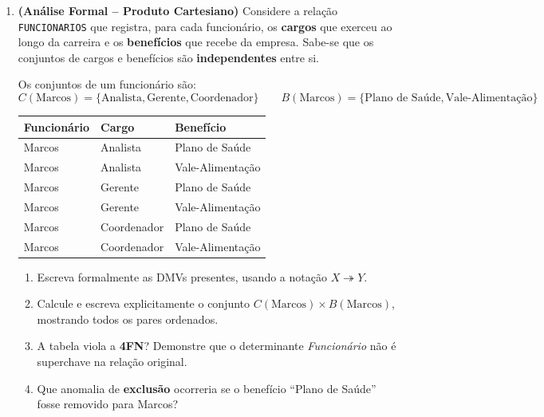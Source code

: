 \documentclass[12pt]{article}
\begin{document}
\begin{enumerate}[label=\textbf{Questão \arabic*:}, leftmargin=*]
  \vspace{0.4cm}

  \item \textbf{(Análise Formal -- Produto Cartesiano)} Considere a relação \texttt{FUNCIONARIOS} que registra, para cada funcionário, os \textbf{cargos} que exerceu ao longo da carreira e os \textbf{benefícios} que recebe da empresa. Sabe-se que os conjuntos de cargos e benefícios são \textbf{independentes} entre si.

  Os conjuntos de um funcionário são:
  \[
    C(\text{Marcos}) = \{\text{Analista}, \text{Gerente}, \text{Coordenador}\}
    \qquad
    B(\text{Marcos}) = \{\text{Plano de Saúde}, \text{Vale-Alimentação}\}
  \]

  \vspace{0.2cm}
  \centering
  \begin{tabular}{|l|l|l|}
    \hline
    \textbf{Funcionário} & \textbf{Cargo} & \textbf{Benefício} \\ \hline
    Marcos & Analista     & Plano de Saúde    \\ \hline
    Marcos & Analista     & Vale-Alimentação  \\ \hline
    Marcos & Gerente      & Plano de Saúde    \\ \hline
    Marcos & Gerente      & Vale-Alimentação  \\ \hline
    Marcos & Coordenador  & Plano de Saúde    \\ \hline
    Marcos & Coordenador  & Vale-Alimentação  \\ \hline
  \end{tabular}
  \flushleft
  \vspace{0.2cm}
  \begin{enumerate}[label=\alph*)]
    \item Escreva formalmente as DMVs presentes, usando a notação $X \twoheadrightarrow Y$.
    \item Calcule e escreva explicitamente o conjunto $C(\text{Marcos}) \times B(\text{Marcos})$, mostrando todos os pares ordenados.
    \item A tabela viola a \textbf{4FN}? Demonstre que o determinante \textit{Funcionário} não é superchave na relação original.
    \item Que anomalia de \textbf{exclusão} ocorreria se o benefício ``Plano de Saúde'' fosse removido para Marcos?
  \end{enumerate}



\end{enumerate}
\end{document}
